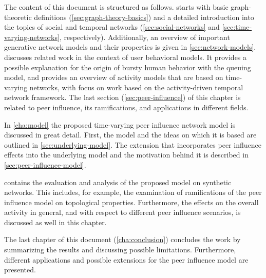 The content of this document is structured as follows.
 starts with basic graph-theoretic definitions (\cref{sec:graph-theory-basics}) and a detailed introduction into the topics of social and temporal networks (\cref{sec:social-networks} and \cref{sec:time-varying-networks}, respectively).
Additionally, an overview of important generative network models and their properties is given in \cref{sec:network-models}.
 discusses related work in the context of user behavioral models.
It provides a possible explanation for the origin of bursty human behavior with the queuing model, and provides an overview of activity models that are based on time-varying networks, with focus on work based on the activity-driven temporal network framework.
The last section (\cref{sec:peer-influence}) of this chapter is related to peer influence, its ramifications, and applications in different fields.

In \cref{cha:model} the proposed time-varying peer influence network model is discussed in great detail.
First, the model and the ideas on which it is based are outlined in \cref{sec:underlying-model}.
The extension that incorporates peer influence effects into the underlying model and the motivation behind it is described in \cref{sec:peer-influence-model}.

 contains the evaluation and analysis of the proposed model on synthetic networks.
This includes, for example, the examination of ramifications of the peer influence model on topological properties.
Furthermore, the effects on the overall activity in general, and with respect to different peer influence scenarios, is discussed as well in this chapter.

The last chapter of this document (\cref{cha:conclusion}) concludes the work
by summarizing the results and discussing possible limitations.
Furthermore, different applications and possible extensions for the peer influence model are presented.
